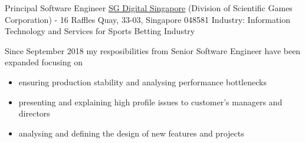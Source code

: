 \documentclass[arial, english, nologo, notitle, totpages]{europecv2013}
\begin{document}

\begin{europecv}
\ecvpersonalinfo[10pt]



	{Principal Software Engineer}
    {\href{https://www.sgdigital.com/}{SG Digital Singapore} {\tiny(Division of Scientific Games Corporation) - 16 Raffles Quay, 33-03, Singapore 048581}}
    {Industry: Information Technology and Services for Sports Betting Industry}
    {
    \begin{small}
    	Since September 2018 my resposibilities from Senior Software Engineer have been expanded focusing on
		\begin{itemize}[label=\raisebox{0.25ex}{\tiny$\bullet$}, leftmargin=+1.0cm]
			\item ensuring production stability and analysing performance bottlenecks
			\item presenting and explaining high profile issues to customer's managers and directors
			\item analysing and defining the design of new features and projects
		\end{itemize}
    \end{small}
    }


\end{europecv}
\end{document}
